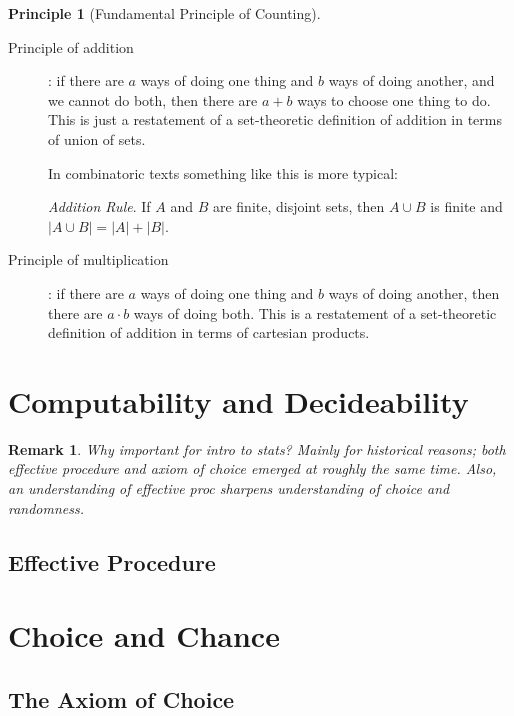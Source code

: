 \documentclass[reqno,12pt]{article}
\numberwithin{equation}{subsection}
\newtheorem{principle}{Principle}
\newtheorem{remark}{Remark}
\begin{document}
\begin{principle}[Fundamental Principle of Counting]

\end{principle}

\begin{description}
\item [Principle of addition]: if there are $a$ ways of doing one thing
  and $b$ ways of doing another, and we cannot do both, then there are
  $a+b$ ways to choose one thing to do.  This is just a restatement of
  a set-theoretic definition of addition in terms of union of sets.

  In combinatoric texts something like this is more typical:

  \textit{Addition Rule}. If $A$ and $B$ are finite, disjoint sets,
  then $A \cup B$ is finite and $|A \cup B| = |A| + |B|$.

\item [Principle of multiplication]: if there are $a$ ways of doing
  one thing and $b$ ways of doing another, then there are $a\cdot b$
  ways of doing both.  This is a restatement of a set-theoretic
  definition of addition in terms of cartesian products.
\end{description}

\section{Computability and Decideability}

\begin{remark}
  Why important for intro to stats?  Mainly for historical reasons;
  both effective procedure and axiom of choice emerged at roughly the
  same time.  Also, an understanding of effective proc sharpens
  understanding of choice and randomness.
\end{remark}

\subsection{Effective Procedure}


\section{Choice and Chance}

\subsection{The Axiom of Choice}
\end{document}
